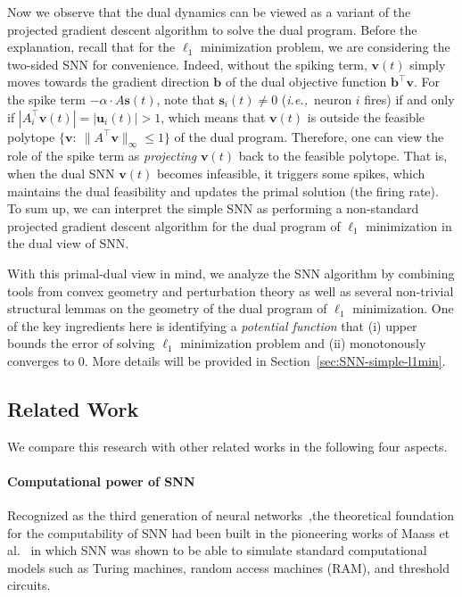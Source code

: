 \documentclass[11pt]{article}
\theoremstyle{remark}
\theoremstyle{definition}
\newcommand{\bb}{\mathbf{b}}
\newcommand{\bv}{\mathbf{v}}
\newcommand{\bu}{\mathbf{u}}
\newcommand{\bs}{\mathbf{s}}
\newcommand{\ie} {{\it i.e.,\ }}
\begin{document}
Now we observe that the dual dynamics can be viewed as a variant of the projected gradient descent algorithm to solve the dual program. Before the explanation, recall that for the $\ell_1$ minimization problem, we are considering the two-sided SNN for convenience. Indeed, without the spiking term, $\bv(t)$ simply moves towards the gradient direction $\bb$ of the dual objective function $\bb^\top\bv$. For the spike term $- \alpha \cdot A\bs(t)$, note that $\bs_i(t) \neq 0$ (\ie neuron $i$ fires) if and only if $|A^\top_i \bv(t)|=|\bu_i(t)| > 1$, which means that $\bv(t)$ is outside the feasible polytope $\{\bv:\ \|A^\top\bv\|_\infty\leq1\}$ of the dual program. Therefore, one can view the role of the spike term as \textit{projecting} $\bv(t)$ back to the feasible polytope. That is, when the dual SNN $\bv(t)$ becomes infeasible, it triggers some spikes, which maintains the dual feasibility and updates the primal solution (the firing rate). To sum up, we can interpret the simple SNN as performing a non-standard projected gradient descent algorithm for the dual program of $\ell_1$ minimization in the dual view of SNN.

With this primal-dual view in mind, we analyze the SNN algorithm by combining tools from convex geometry and perturbation theory as well as several non-trivial structural lemmas on the geometry of the dual program of $\ell_1$ minimization. One of the key ingredients here is identifying a \textit{potential function} that (i) upper bounds the error of solving $\ell_1$ minimization problem and (ii) monotonously converges to $0$. More details will be provided in Section~\ref{sec:SNN-simple-l1min}.


\subsection{Related Work}\label{sec:intro related}
We compare this research with other related works in the following four aspects.

\paragraph{Computational power of SNN}
Recognized as the third generation of neural networks~\cite{maass1997networks},the theoretical foundation for the computability of SNN had been built in the pioneering works of Maass et al.~\cite{maass1996lower,maass1997networks,maass19992,maass2001pulsed} in which SNN was shown to be able to simulate standard computational models such as Turing machines, random access machines (RAM), and threshold circuits. 
\end{document}
